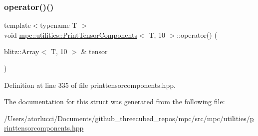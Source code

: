 \subsubsection{\texorpdfstring{operator()()}{operator()()}}
{\footnotesize\ttfamily template$<$typename T $>$ \\
void \mbox{\hyperlink{structmpc_1_1utilities_1_1_print_tensor_components}{mpc\+::utilities\+::\+Print\+Tensor\+Components}}$<$ T, 10 $>$\+::operator() (\begin{DoxyParamCaption}\item[{blitz\+::\+Array$<$ T, 10 $>$ \&}]{tensor }\end{DoxyParamCaption})\hspace{0.3cm}{\ttfamily [inline]}}



Definition at line 335 of file printtensorcomponents.\+hpp.



The documentation for this struct was generated from the following file\+:\begin{DoxyCompactItemize}
\item 
/\+Users/atorlucci/\+Documents/github\+\_\+threecubed\+\_\+repos/mpc/src/mpc/utilities/\mbox{\hyperlink{printtensorcomponents_8hpp}{printtensorcomponents.\+hpp}}\end{DoxyCompactItemize}
